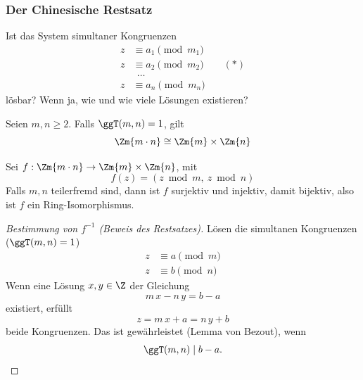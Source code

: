 \subsubsection*{Der Chinesische Restsatz}


Ist das System simultaner Kongruenzen
\begin{align*}
z &\equiv a_1 \pmod{m_1} \\
z &\equiv a_2 \pmod{m_2} \qquad (*) \\
&\ \ \ldots \\
z &\equiv a_n \pmod{m_n}
\end{align*}
lösbar? Wenn ja, wie und wie viele Lösungen existieren?

\begin{satz}
Seien $m, n \geq 2$. Falls $\ggT(m, n) = 1$, gilt
\[ \Zm{m \cdot n} \cong \Zm{m} \times \Zm{n} \]
\end{satz}

Sei $f : \Zm{m \cdot n} \to \Zm{m} \times \Zm{n}$, mit
\[ f(z) = (z \bmod m,\ z \bmod n) \]
Falls $m, n$ teilerfremd sind, dann ist $f$ surjektiv und injektiv, damit bijektiv, also ist $f$ ein Ring-Isomorphismus.

\begin{proof}[Bestimmung von $f^{-1}$ (Beweis des Restsatzes)]
Lösen die simultanen Kongruenzen ($\ggT(m, n) = 1$)
\begin{align*}
z &\equiv a \pmod{m} \\
z &\equiv b \pmod{n}
\end{align*}
Wenn eine Lösung $x, y \in \Z$ der Gleichung
\[ m\,x - n\,y = b - a \]
existiert, erfüllt
\[ z = m\,x + a = n\,y + b \]
beide Kongruenzen. Das ist gewährleistet (Lemma von Bezout), wenn
\[ \ggT(m, n) \mid b - a. \qedhere \]
\end{proof}

